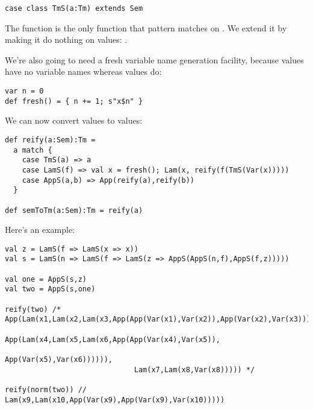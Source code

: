 \begin{lstlisting}
case class TmS(a:Tm) extends Sem
\end{lstlisting}

The  function is the only function that pattern matches on . We extend it by making it do nothing on  values: .

We're also going to need a fresh variable name generation facility, because  values have no variable names whereas  values do:

\begin{lstlisting}
var n = 0
def fresh() = { n += 1; s"x$n" }
\end{lstlisting}

We can now convert  values to  values:

\begin{lstlisting}
def reify(a:Sem):Tm =
  a match {
    case TmS(a) => a
    case LamS(f) => val x = fresh(); Lam(x, reify(f(TmS(Var(x)))))
    case AppS(a,b) => App(reify(a),reify(b))
  }

def semToTm(a:Sem):Tm = reify(a)
\end{lstlisting}

Here's an example:

\begin{lstlisting}
val z = LamS(f => LamS(x => x))
val s = LamS(n => LamS(f => LamS(z => AppS(AppS(n,f),AppS(f,z)))))

val one = AppS(s,z)
val two = AppS(s,one)

reify(two) /* App(Lam(x1,Lam(x2,Lam(x3,App(App(Var(x1),Var(x2)),App(Var(x2),Var(x3)))))),
                        App(Lam(x4,Lam(x5,Lam(x6,App(App(Var(x4),Var(x5)),
                                                          App(Var(x5),Var(x6)))))),
                              Lam(x7,Lam(x8,Var(x8))))) */

reify(norm(two)) // Lam(x9,Lam(x10,App(Var(x9),App(Var(x9),Var(x10)))))
\end{lstlisting}


